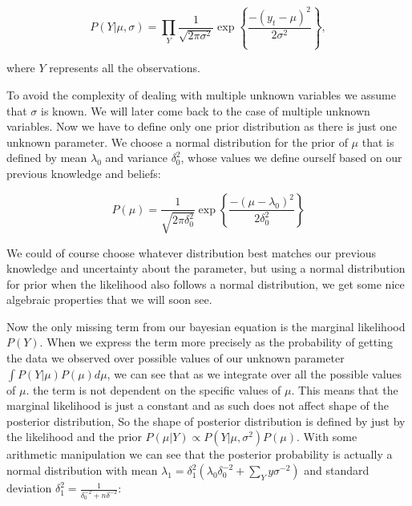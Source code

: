 \documentclass[12pt,a4paper,leqno]{report}
\theoremstyle{plain}
\theoremstyle{definition}
\theoremstyle{remark}
\begin{document}
\begin{def}\label{}
    \begin{equation}\label{}
        P(Y|\mu, \sigma)
        =
        \prod_{Y}
        \frac{1}
        {{\sqrt {2\pi \sigma^2} }}
        \exp{
            \left \{
            \frac{-(y_t - \mu)^2}
            {2\sigma^2}
            \right \}
        },
    \end{equation}
\end{def}where \(Y\) represents all the observations.

To avoid the complexity of dealing with multiple unknown variables we assume that
\(\sigma \) is known. We will later come back to the case of multiple unknown variables.
Now we have to define only one prior distribution as there is just one unknown parameter.
We choose a normal distribution for the prior of \(\mu\) that is defined by mean
\(\lambda_0 \) and variance \(\delta_0^2 \), whose values we define ourself based on our
previous knowledge and beliefs:

\begin{def}\label{}
    \begin{equation}\label{}
        P(\mu)
        =
        \frac{1}
        {{\sqrt {2\pi \delta_0^2} }}
        \exp{
            \left \{
            \frac{
                -(\mu - \lambda_0)^2
            }
            {2\delta_0^2}
            \right \}
        }
    \end{equation}
\end{def}

We could of course choose whatever distribution best matches our previous knowledge and
uncertainty about the parameter, but using a normal distribution for prior when the
likelihood also follows a normal distribution, we get some nice algebraic properties that
we will soon see.

Now the only missing term from our bayesian equation is the marginal likelihood \(P(Y)
\). When we express the term more precisely as the probability of getting the data we
observed over possible values of our unknown parameter \(\int P(Y|\mu)P(\mu) d\mu \), we
can see that as we integrate over all the possible values of \(\mu \). the term is not
dependent on the specific values of \(\mu \). This means that the marginal likelihood is
just a constant and as such does not affect shape of the posterior distribution, So the
shape of posterior distribution is defined by just by the likelihood and the prior
\(P(\mu|Y) \propto P(Y|\mu, \sigma^2)P(\mu) \). With some arithmetic manipulation we can
see that the posterior probability is actually a normal distribution with mean
\(\lambda_1 = \delta_1^2 \left( \lambda_0 \delta_0^{-2} + \sum_{Y} y \sigma^{-2} \right)
\) and standard deviation \(\delta_1^2 = \frac{1}{\delta_0^{-2}+n\delta^{-2}} \):
\end{document}
